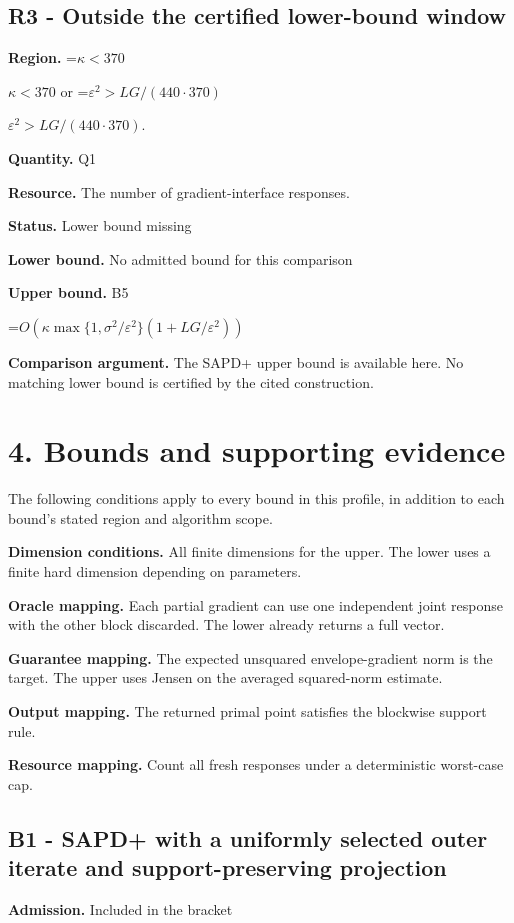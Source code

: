 \documentclass[10pt,a4paper]{article}
\newcommand{\AtlasMath}[1]{\par\begingroup\centering\setbox0=\hbox{$\displaystyle #1$}\ifdim\wd0>1.4\linewidth\typeout{ATLAS WIDE FORMULA: \the\wd0}\fi\ifdim\wd0>\linewidth\resizebox{\linewidth}{!}{\box0}\else\box0\fi\par\endgroup}
\newcommand{\AtlasInlineMath}[1]{\begingroup\setbox0=\hbox{$#1$}\ifdim\wd0>.4\linewidth\endgroup\AtlasMath{#1}\else\endgroup$#1$\fi}
\begin{document}
\subsection{R3 - Outside the certified lower-bound window}
\textbf{Region.} \AtlasInlineMath{\kappa<370} or \AtlasInlineMath{\varepsilon^2>LG/(440\cdot370)}.

\textbf{Quantity.} Q1

\textbf{Resource.} The number of gradient-interface responses.

\textbf{Status.} Lower bound missing

\textbf{Lower bound.} No admitted bound for this comparison

\textbf{Upper bound.} B5

\AtlasMath{O\!\left(\kappa\max\{1,\sigma^2/\varepsilon^2\}\left(1+LG/\varepsilon^2\right)\right)}
\textbf{Comparison argument.} The SAPD+ upper bound is available here. No matching lower bound is certified by the cited construction.

\section{4. Bounds and supporting evidence}
The following conditions apply to every bound in this profile, in addition to each bound's stated region and algorithm scope.

\textbf{Dimension conditions.} All finite dimensions for the upper. The lower uses a finite hard dimension depending on parameters.

\textbf{Oracle mapping.} Each partial gradient can use one independent joint response with the other block discarded. The lower already returns a full vector.

\textbf{Guarantee mapping.} The expected unsquared envelope-gradient norm is the target. The upper uses Jensen on the averaged squared-norm estimate.

\textbf{Output mapping.} The returned primal point satisfies the blockwise support rule.

\textbf{Resource mapping.} Count all fresh responses under a deterministic worst-case cap.

\subsection{B1 - SAPD+ with a uniformly selected outer iterate and support-preserving projection}
\textbf{Admission.} Included in the bracket
\end{document}
